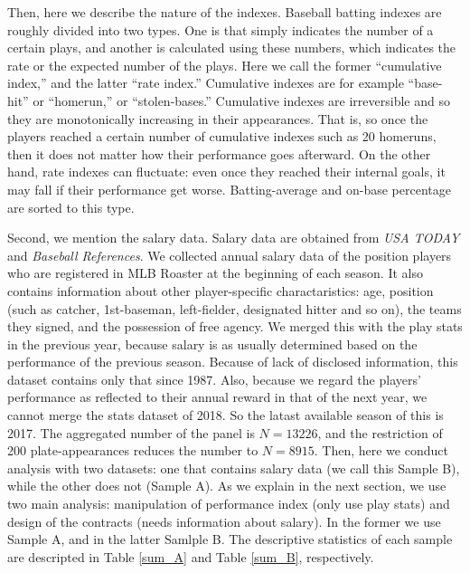 \documentclass[dvipdfmx, 12pt]{article}
\begin{document}
Then, here we describe the nature of the indexes. Baseball batting indexes are roughly divided into two types. One is that simply indicates the number of a certain plays, and another is calculated using these numbers, which indicates the rate or the expected number of the plays. Here we call the former ``cumulative index,'' and the latter ``rate index.'' Cumulative indexes are for example ``base-hit'' or ``homerun,'' or ``stolen-bases.'' Cumulative indexes are irreversible and so they are monotonically increasing in their appearances. That is, so once the players reached a certain number of cumulative indexes such as 20 homeruns, then it does not matter how their performance goes afterward. On the other hand, rate indexes can fluctuate: even once they reached their internal goals, it may fall if their performance get worse. Batting-average and on-base percentage are sorted to this type.

Second, we mention the salary data. Salary data are obtained from \textit{USA TODAY} and \textit{Baseball References}. We collected annual salary data of the position players who are registered in MLB Roaster at the beginning of each season. It also contains information about other player-specific charactaristics: age, position (such as catcher, 1st-baseman, left-fielder, designated hitter and so on), the teams they signed, and the possession of free agency. We merged this with the play stats in the previous year, because salary is as usually determined based on the performance of the previous season. Because of lack of disclosed information, this dataset contains only that since 1987. Also, because we regard the players' performance as reflected to their annual reward in that of the next year, we cannot merge the stats dataset of 2018. So the latast available season of this is 2017. The aggregated number of the panel is $N=13226$, and the restriction of 200 plate-appearances reduces the number to $N=8915$. Then, here we conduct analysis with two datasets: one that contains salary data (we call this Sample B), while the other does not (Sample A). As we explain in the next section, we use two main analysis: manipulation of performance index (only use play stats) and design of the contracts (needs information about salary). In the former we use Sample A, and in the latter Samlple B. The descriptive statistics of each sample are descripted in Table \ref{sum_A} and Table \ref{sum_B}, respectively.

\begin{table}
  
\end{table}
\end{document}
